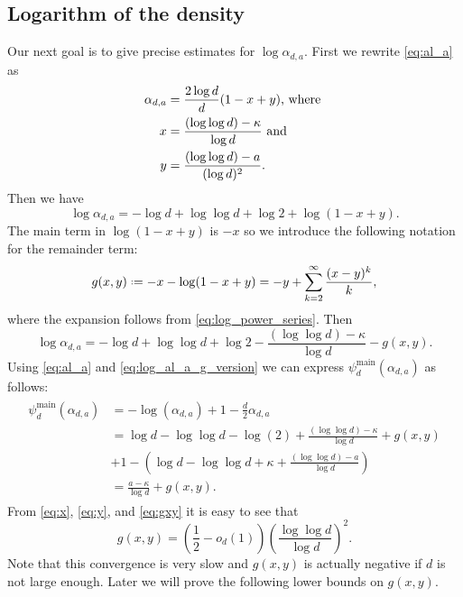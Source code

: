 \documentclass[12pt]{amsart}
\theoremstyle{definition}
\newcommand\al{\alpha}
\newcommand\ka{\kappa}
\newcommand\psimain{\psi^{\mathrm{main}}}
\newcommand{\defeq}{\mathrel{\vcenter{\baselineskip0.5ex \lineskiplimit0pt
                     \hbox{\scriptsize.}\hbox{\scriptsize.}}}%
                     =}
\begin{document}
\subsection{Logarithm of the density}
%
Our next goal is to give precise estimates for $\log \al_{d,a}$. First we rewrite \eqref{eq:al_a} as 
%
\begin{align}
\al_{d,a} &= \frac{2\log d}{d} (1-x+y) \text{, where } \notag \\
x &=\frac{(\log\log d)-\ka}{\log d} \text{ and} 
\label{eq:x} \\
y &=\frac{(\log\log d)-a}{(\log d)^2} .
\label{eq:y}
\end{align}
%
Then we have 
%
\begin{equation}
\log \al_{d,a} 
= -\log d + \log\log d + \log 2 + \log(1-x+y) .
\label{eq:log_al_a} 
\end{equation} 
%
The main term in $\log(1-x+y)$ is $-x$ so we introduce the following notation for the remainder term:
%
\begin{equation} \label{eq:gxy}
g(x,y) \defeq -x-\log(1-x+y)
= -y + \sum_{k=2}^\infty \frac{(x-y)^k}{k} ,
\end{equation}
%
where the expansion follows from \eqref{eq:log_power_series}. Then 
\begin{equation}
\log \al_{d,a} 
= -\log d + \log\log d + \log 2 
- \frac{(\log\log d)-\ka}{\log d} - g(x,y) .
\label{eq:log_al_a_g_version} 
\end{equation} 
%
Using \eqref{eq:al_a} and \eqref{eq:log_al_a_g_version} we can express $\psimain_d(\al_{d,a})$ as follows:
%
\begin{align}
\begin{split}
\psimain_d(\al_{d,a}) 
&=  -\log(\al_{d,a}) + 1 - \frac{d}{2} \al_{d,a} \\
&= \log d - \log\log d - \log(2) 
+ \frac{(\log\log d)-\ka}{\log d} + g(x,y) \\
&+ 1 - \left( \log d - \log\log d + \ka 
+ \frac{(\log\log d) - a}{\log d} \right)\\
&= \frac{a-\ka}{\log d} + g(x,y) .
\label{eq:Psi_g}
\end{split}
\end{align}
%
From \eqref{eq:x}, \eqref{eq:y}, and \eqref{eq:gxy} it is easy to see that 
%
\begin{equation} \label{eq:gxy_asymptotics}
g(x,y) = \left(\frac 12 - o_d(1) \right) 
\left( \frac{\log\log d}{\log d} \right)^2 .
\end{equation}
%
Note that this convergence is very slow and $g(x,y)$ is actually negative if $d$ is not large enough. Later we will prove the following lower bounds on $g(x,y)$.
\end{document}
